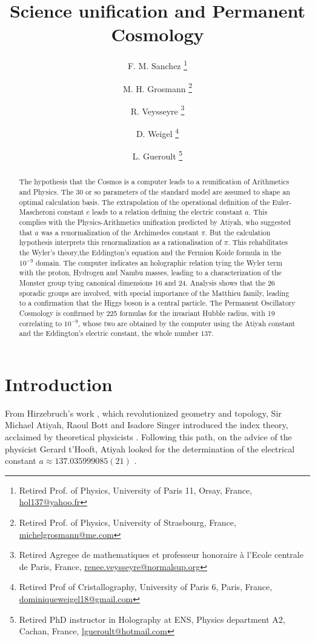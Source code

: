 \documentclass[a4paper,9pt]{article}
\title{Science unification and Permanent Cosmology}
\author{F. M. Sanchez \thanks{Retired Prof. of Physics, University of Paris 11, Orsay, France, \href{mailto:hol137@yahoo.fr}{hol137@yahoo.fr}} 
   \and M. H. Grosmann \thanks{Retired Prof. of Physics, University of Strasbourg, France, \href{mailto:michelgrosmann@me.com}{michelgrosmann@me.com}}
   \and R. Veysseyre \thanks{Retired Agregee de mathematiques et professeur honoraire \`a l'Ecole centrale de Paris, France, \href{mailto:renee.veysseyre@normalsup.org}{renee.veysseyre@normalsup.org}}
   \and D. Weigel  \thanks{Retired Prof of Cristallography, University of Paris 6, Paris, France, \href{mailto:dominiqueweigel18@gmail.com}{dominiqueweigel18@gmail.com}} 
   \and L. Gueroult \thanks{Retired PhD instructor in Holography at ENS, Physics department A2, Cachan, France, \href{mailto:lgueroult@hotmail.com}{lgueroult@hotmail.com}}
   }
\begin{document}
\setcounter{page}{1}

\maketitle

\begin{abstract}
The hypothesis that the Cosmos is a computer leads to a reunification of Arithmetics and Physics. The 30 or so parameters of the standard model are assumed to shape an optimal calculation basis. The extrapolation of the operational definition of the Euler-Mascheroni constant $e$ leads to a relation defining the electric constant $a$. This complies with the Physics-Arithmetics unification predicted by Atiyah, who suggested that $a$ was a renormalization of the Archimedes constant $\pi$. But the calculation hypothesis interprets this renormalization as a rationalisation of $\pi$. This rehabilitates the Wyler's theory,the Eddington's equation and the Fermion Koide formula in the $10^{-9}$ domain. The computer indicates an holographic relation tying the Wyler term with the proton, Hydrogen and Nambu masses, leading to a characterization of the Monster group tying canonical dimensions 16 and 24. Analysis shows that the 26 sporadic groups are involved, with special importance of the Matthieu family, leading to a confirmation that the Higgs boson is a central particle. The Permanent Oscillatory Cosmology is confirmed by 225 formulas for the invariant Hubble radius, with 19 correlating to $10^{-9}$, whose two are obtained by the computer using the Atiyah constant and the Eddington's electric constant, the whole number $137 $. 
\end{abstract}





\label{sec:headings}

\section{Introduction}
  
    From Hirzebruch's work \cite{Hirzebruch}, which revolutionized geometry and topology, Sir Michael Atiyah, Raoul Bott \cite{Bott} and Isadore Singer \cite{Singer} introduced the index theory, acclaimed by theoretical physicists \cite{Alvarez}. Following this path, on the advice of the physicist Gerard t'Hooft, Atiyah looked for the determination of the electrical constant $a \approx 137.035999085(21)$ \cite{Atiyah}.
    
\end{document}
